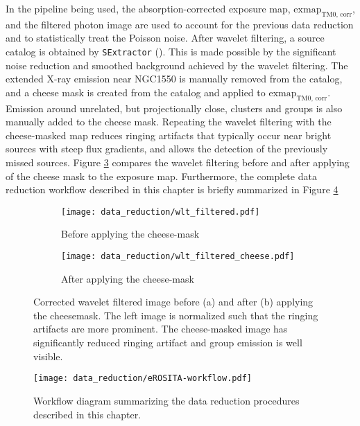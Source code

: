 In the pipeline being used, the absorption-corrected exposure map, \(\text{exmap}_\text{TM0, corr}\), and the filtered photon image are used to account for the previous data reduction and to statistically treat the Poisson noise. After wavelet filtering, a source catalog is obtained by \texttt{SExtractor} (\cite{Bertin1996}). This is made possible by the significant noise reduction and smoothed background achieved by the wavelet filtering. The extended X-ray emission near NGC1550 is manually removed from the catalog, and a cheese mask is created from the catalog and applied to \(\text{exmap}_\text{TM0, corr}\). Emission around unrelated, but projectionally close, clusters and groups is also manually added to the cheese mask. Repeating the wavelet filtering with the cheese-masked map reduces ringing artifacts that typically occur near bright sources with steep flux gradients, and allows the detection of the previously missed sources. Figure \ref{fig:comparison_wvl_filtered} compares the wavelet filtering before and after applying of the cheese mask to the exposure map. Furthermore, the complete data reduction workflow described in this chapter is briefly summarized in Figure \ref{fig:good_soup}
%
\begin{figure}[htbp]
    \centering
    \begin{subfigure}[b]{0.48\textwidth}
        \centering
        \texttt{[image: data\_reduction/wlt\_filtered.pdf]}
        \caption{Before applying the cheese-mask}
        \label{fig:wlt_filtered}
    \end{subfigure}
    \hfill
    \begin{subfigure}[b]{0.48\textwidth}
        \centering
        \texttt{[image: data\_reduction/wlt\_filtered\_cheese.pdf]}
        \caption{After applying the cheese-mask}
        \label{fig:wvl_filtered_cheesed}
    \end{subfigure}
    \caption[Corrected wavelet filtered image before and after applying the cheesemask.]{Corrected wavelet filtered image before (a) and after (b) applying the cheesemask. The left image is normalized such that the ringing artifacts are more prominent. The cheese-masked image has significantly reduced ringing artifact and group emission is well visible.}
    \label{fig:comparison_wvl_filtered}
\end{figure}
%
\begin{figure}[htbp]
    \centering
    \texttt{[image: data\_reduction/eROSITA-workflow.pdf]}
    \caption[Workflow diagram of the data reduction procedures.]{Workflow diagram summarizing the data reduction procedures described in this chapter.}
    \label{fig:good_soup}
\end{figure}




